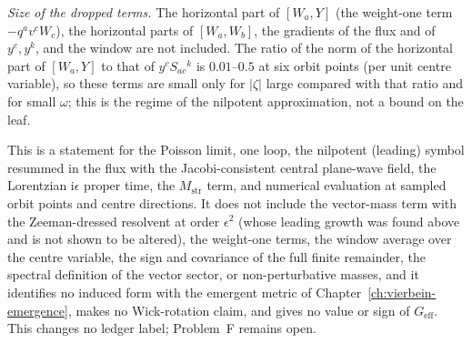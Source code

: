 \emph{Size of the dropped terms.} The horizontal part of \([W_a,Y]\) (the weight-one term \(-q^av^cW_c\)), the horizontal parts of \([W_a,W_b]\), the gradients of the flux and of \(y^c,y^k\), and the window are not included. The ratio of the norm of the horizontal part of \([W_a,Y]\) to that of \(y^cS_{ac}{}^k\) is \(0.01\)--\(0.5\) at six orbit points (per unit centre variable), so these terms are small only for \(|\zeta|\) large compared with that ratio and for small \(\omega\); this is the regime of the nilpotent approximation, not a bound on the leaf.

This is a statement for the Poisson limit, one loop, the nilpotent (leading) symbol resummed in the flux with the Jacobi-consistent central plane-wave field, the Lorentzian \(\mathrm i\epsilon\) proper time, the \(M_{\mathrm{str}}\) term, and numerical evaluation at sampled orbit points and centre directions. It does not include the vector-mass term with the Zeeman-dressed resolvent at order \(\epsilon^2\) (whose leading growth was found above and is not shown to be altered), the weight-one terms, the window average over the centre variable, the sign and covariance of the full finite remainder, the spectral definition of the vector sector, or non-perturbative masses, and it identifies no induced form with the emergent metric of Chapter~\ref{ch:vierbein-emergence}, makes no Wick-rotation claim, and gives no value or sign of \(G_{\mathrm{eff}}\). This changes no ledger label; Problem~F remains open.
